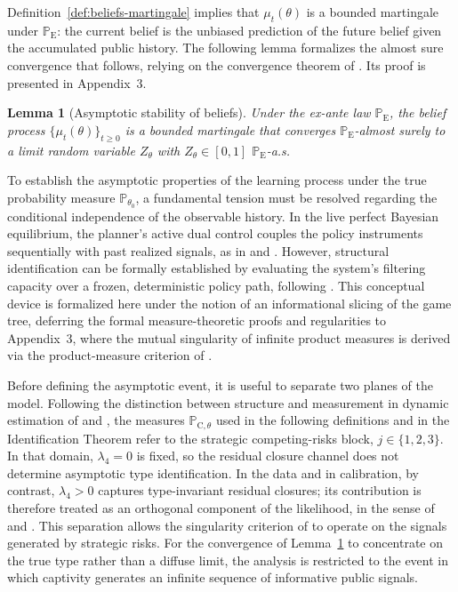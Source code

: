 \documentclass[review,authoryear,12pt]{elsarticle}
\theoremstyle{plain}
\newtheorem{lemma}[theorem]{Lemma}
\theoremstyle{definition}
\newcommand{\ProbE}{\mathbb{P}_{\mathrm{E}}}
\newcommand{\ProbC}[1]{\mathbb{P}_{\mathrm{C},#1}}
\newcommand{\1}{\mathbf{1}}
\begin{document}
Definition~\ref{def:beliefs-martingale} implies that $\mu_t(\theta)$ is a bounded martingale under $\ProbE$: the current belief is the unbiased prediction of the future belief given the accumulated public history. The following lemma formalizes the almost sure convergence that follows, relying on the convergence theorem of \citet{Doob1953Stochastic}. Its proof is presented in Appendix~3.

\begin{lemma}[Asymptotic stability of beliefs]\label{lem:asymptotic-beliefs}
Under the ex-ante law $\ProbE$, the belief process $\{\mu_t(\theta)\}_{t\ge 0}$ is a bounded martingale that converges $\ProbE$-almost surely to a limit random variable $Z_\theta$ with $Z_\theta\in[0,1]$ $\ProbE$-a.s.
\end{lemma}

\smallskip

To establish the asymptotic properties of the learning process under the true probability measure $\mathbb{P}_{\theta_0}$, a fundamental tension must be resolved regarding the conditional independence of the observable history. In the live perfect Bayesian equilibrium, the planner's active dual control couples the policy instruments sequentially with past realized signals, as in \citet{AghionBoltonHarrisJullien1991} and \citet{EasleyKiefer1988}. However, structural identification can be formally established by evaluating the system's filtering capacity over a frozen, deterministic policy path, following \citet{BlackwellDubins1962}. This conceptual device is formalized here under the notion of an informational slicing of the game tree, deferring the formal measure-theoretic proofs and regularities to Appendix~3, where the mutual singularity of infinite product measures is derived via the product-measure criterion of \citet{Kakutani1948}.

Before defining the asymptotic event, it is useful to separate two planes of the model. Following the distinction between structure and measurement in dynamic estimation of \citet{Rust1987} and \citet{MagnacThesmar2002}, the measures $\ProbC{\theta}$ used in the following definitions and in the Identification Theorem refer to the strategic competing-risks block, $j\in\{1,2,3\}$. In that domain, $\lambda_4=0$ is fixed, so the residual closure channel does not determine asymptotic type identification. In the data and in calibration, by contrast, $\lambda_4>0$ captures type-invariant residual closures; its contribution is therefore treated as an orthogonal component of the likelihood, in the sense of \citet{Lancaster1990} and \citet{AbbringVanDenBerg2003}. This separation allows the singularity criterion of \citet{Kakutani1948} to operate on the signals generated by strategic risks. For the convergence of Lemma~\ref{lem:asymptotic-beliefs} to concentrate on the true type rather than a diffuse limit, the analysis is restricted to the event in which captivity generates an infinite sequence of informative public signals.
\end{document}
